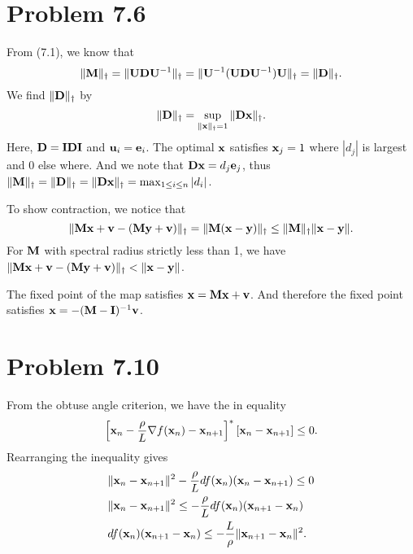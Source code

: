 \documentclass{scrartcl}
\begin{document}

\section*{Problem 7.6}

From (7.1), we know that
\begin{equation}
\|\mathbf{M}\|_\dagger = \|\mathbf{U}\mathbf{D}\mathbf{U}^{-1}\|_\dagger = \|\mathbf{U}^{-1}(\mathbf{U}\mathbf{D}\mathbf{U}^{-1})\mathbf{U}\|_\dagger = \|\mathbf{D}\|_\dagger.
\end{equation}
We find $\|\mathbf{D}\|_\dagger$ by
\begin{equation}
    \|\mathbf{D}\|_\dagger = \sup_{\|\mathbf{x}\|_\dagger = 1} \|\mathbf{D} \mathbf{x}\|_\dagger.
\end{equation}
Here, $\mathbf{D} = \mathbf{I}\mathbf{D}\mathbf{I}$ and $\mathbf{u}_i = \mathbf{e}_i$. The optimal $\mathbf{x}$ satisfies $\mathbf{x}_j = 1$ where $|d_j|$ is largest and $0$ else where.
And we note that $\mathbf{D}\mathbf{x} = d_j \mathbf{e}_j$, thus $\|\mathbf{M}\|_\dagger = \|\mathbf{D}\|_\dagger = \|\mathbf{D}\mathbf{x}\|_\dagger = \max_{1 \le i \le n} |d_i|$.

To show contraction, we notice that
\begin{equation}
    \|\mathbf{M}\mathbf{x} + \mathbf{v} - (\mathbf{M}\mathbf{y} + \mathbf{v})\|_\dagger = \|\mathbf{M}(\mathbf{x} - \mathbf{y}) \|_\dagger \le \|\mathbf{M}\|_\dagger \|\mathbf{x}-\mathbf{y}\|.
\end{equation}
For $\mathbf{M}$ with spectral radius strictly less than 1, we have $\|\mathbf{M}\mathbf{x} + \mathbf{v} - (\mathbf{M}\mathbf{y} + \mathbf{v})\|_\dagger < \|\mathbf{x}-\mathbf{y}\|$.

The fixed point of the map satisfies $\mathbf{x} = \mathbf{M}\mathbf{x} + \mathbf{v}$. And therefore the fixed point satisfies $\mathbf{x} = -(\mathbf{M}-\mathbf{I})^{-1}\mathbf{v}$.


\section*{Problem 7.10}

From the obtuse angle criterion, we have the in equality
\begin{equation}
\left[ \mathbf{x}_n - {\rho \over L} \nabla f(\mathbf{x}_n) - \mathbf{x}_{n+1} \right]^*[\mathbf{x}_{n} - \mathbf{x}_{n+1}] \le 0.
\end{equation}
Rearranging the inequality gives
\begin{equation}
\begin{split}
& \|\mathbf{x}_n - \mathbf{x}_{n+1}\|^2 - {\rho \over L} df(\mathbf{x}_n)(\mathbf{x}_n - \mathbf{x}_{n+1}) \le 0 \\
& \|\mathbf{x}_n - \mathbf{x}_{n+1}\|^2 \le -{\rho \over L} df(\mathbf{x}_n)(\mathbf{x}_{n+1} - \mathbf{x}_{n}) \\
& df(\mathbf{x}_n)(\mathbf{x}_{n+1} - \mathbf{x}_{n}) \le -{L \over \rho} \|\mathbf{x}_{n+1} - \mathbf{x}_{n}\|^2.
\end{split}
\end{equation}
\end{document}
